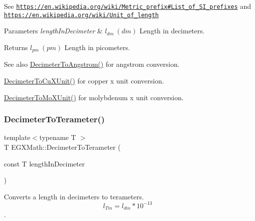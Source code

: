 See \href{https://en.wikipedia.org/wiki/Metric_prefix#List_of_SI_prefixes}{\tt https\+://en.\+wikipedia.\+org/wiki/\+Metric\+\_\+prefix\#\+List\+\_\+of\+\_\+\+S\+I\+\_\+prefixes} and \href{https://en.wikipedia.org/wiki/Unit_of_length}{\tt https\+://en.\+wikipedia.\+org/wiki/\+Unit\+\_\+of\+\_\+length} 
\begin{DoxyParams}{Parameters}
{\em length\+In\+Decimeter} & $ l_{dm}\ (dm)$ Length in decimeters. \\
\hline
\end{DoxyParams}
\begin{DoxyReturn}{Returns}
$ l_{pm}\ (pm)$ Length in picometers. 
\end{DoxyReturn}
\begin{DoxySeeAlso}{See also}
\mbox{\hyperlink{group___e_g_x_math-_conversions-_length_conversions-_decimeter-_non-_s_i_gaffa5876e4f15bc859c369e8bfb9e4183}{Decimeter\+To\+Angstrom()}} for angstrom conversion. 

\mbox{\hyperlink{group___e_g_x_math-_conversions-_length_conversions-_decimeter-_non-_s_i_gab595b2398e8e838922b4591308466e87}{Decimeter\+To\+Cu\+X\+Unit()}} for copper x unit conversion. 

\mbox{\hyperlink{group___e_g_x_math-_conversions-_length_conversions-_decimeter-_non-_s_i_ga609f53e09c9a767639da3ad72905bb71}{Decimeter\+To\+Mo\+X\+Unit()}} for molybdenum x unit conversion. 
\end{DoxySeeAlso}
\mbox{\label{group___e_g_x_math-_conversions-_length_conversions-_decimeter-_s_i_ga182e057812e247aa0058051c08e29bee}} 
\subsubsection{\texorpdfstring{Decimeter\+To\+Terameter()}{DecimeterToTerameter()}}
{\footnotesize\ttfamily template$<$typename T $>$ \\
T E\+G\+X\+Math\+::\+Decimeter\+To\+Terameter (\begin{DoxyParamCaption}\item[{const T}]{length\+In\+Decimeter }\end{DoxyParamCaption})}



Converts a length in decimeters to terameters. \[ l_{Tm}=l_{dm} * 10^{-13} \]. 


